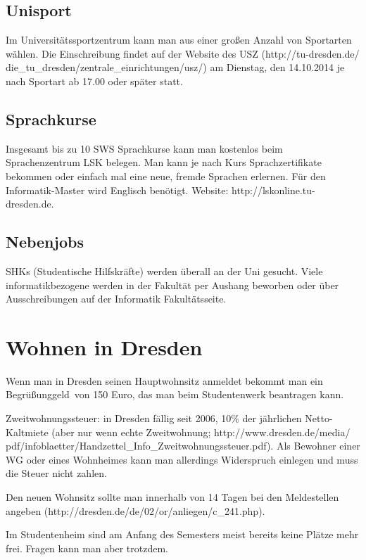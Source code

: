 \documentclass[a4paper,12pt]{report}
\begin{document}
\subsection{Unisport}
Im Universitätssportzentrum kann man aus einer großen Anzahl von Sportarten wählen.
Die Einschreibung findet auf der Website des USZ (http://tu-dresden.de/ die\_tu\_dresden/zentrale\_einrichtungen/usz/) am Dienstag, den 14.10.2014 je nach Sportart ab 17.00 oder später statt.

\subsection{Sprachkurse}
Insgesamt bis zu 10 SWS Sprachkurse kann man kostenlos beim Sprachenzentrum LSK belegen.
Man kann je nach Kurs Sprachzertifikate bekommen oder einfach mal eine neue, fremde Sprachen erlernen.
Für den Informatik-Master wird Englisch benötigt.
Website: http://lskonline.tu-dresden.de.

\subsection{Nebenjobs}
SHKs (Studentische Hilfskräfte) werden überall an der Uni gesucht.
Viele informatikbezogene werden in der Fakultät per Aushang beworben oder über Ausschreibungen auf der Informatik Fakultätsseite.

\section{Wohnen in Dresden}
\begin{itemize*}
	\item Wenn man in Dresden seinen Hauptwohnsitz anmeldet bekommt man ein \glqq Begrüßunggeld\grqq\ von 150 Euro, das man beim Studentenwerk beantragen kann.
	\item Zweitwohnungssteuer: in Dresden fällig seit 2006, 10\% der jährlichen Netto-Kaltmiete (aber nur wenn echte Zweitwohnung; http://www.dresden.de/media/ pdf/infoblaetter/Handzettel\_Info\_Zweitwohnungssteuer.pdf).
	Als Bewohner einer WG oder eines Wohnheimes kann man allerdings Widerspruch einlegen und muss die Steuer nicht zahlen.
	\item Den neuen Wohnsitz sollte man innerhalb von 14 Tagen bei den Meldestellen angeben (http://dresden.de/de/02/or/anliegen/c\_241.php).
	\item Im Studentenheim sind am Anfang des Semesters meist bereits keine Plätze mehr frei.
	Fragen kann man aber trotzdem.
\end{itemize*}
\end{document}
